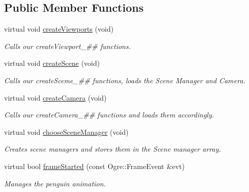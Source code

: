 \subsection*{Public Member Functions}
\begin{DoxyCompactItemize}
\item 
virtual void \hyperlink{class_basic_tutorial__00_adc2454d9f8226e0958ecf702f355846e}{create\+Viewports} (void)
\begin{DoxyCompactList}\small\item\em Calls our create\+Viewport\+\_\+\#\# functions. \end{DoxyCompactList}\item 
virtual void \hyperlink{class_basic_tutorial__00_a15a3d4673724ec99077ce992f996a550}{create\+Scene} (void)
\begin{DoxyCompactList}\small\item\em Calls our create\+Sceme\+\_\+\#\# functions, loads the Scene Manager and Camera. \end{DoxyCompactList}\item 
virtual void \hyperlink{class_basic_tutorial__00_a1bf709417d654dffc2ea10987412b912}{create\+Camera} (void)
\begin{DoxyCompactList}\small\item\em Calls our create\+Camera\+\_\+\#\# functions and loads them accordingly. \end{DoxyCompactList}\item 
virtual void \hyperlink{class_basic_tutorial__00_aba97a29d983586d2dc8e108d3bccf721}{choose\+Scene\+Manager} (void)
\begin{DoxyCompactList}\small\item\em Creates scene managers and stores them in the Scene manager array. \end{DoxyCompactList}\item 
virtual bool \hyperlink{class_basic_tutorial__00_a94e281a96584a25bf57b1c5e73737c81}{frame\+Started} (const Ogre\+::\+Frame\+Event \&evt)
\begin{DoxyCompactList}\small\item\em Manages the penguin animation. \end{DoxyCompactList}\end{DoxyCompactItemize}
